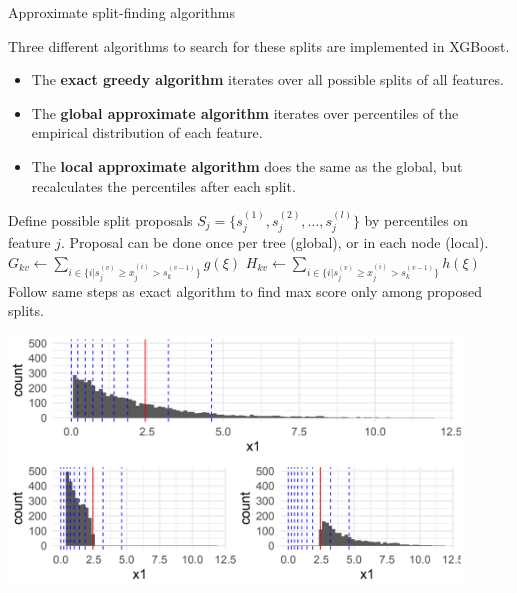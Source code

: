 \begin{vbframe}{Approximate split-finding algorithms}

Three different algorithms to search for these splits are implemented in XGBoost.

\lz

\begin{itemize}
\item[] The \textbf{exact greedy algorithm} iterates over all possible splits of all features.
\lz
\item[] The \textbf{global approximate algorithm} iterates over percentiles of the empirical distribution of each feature.
\lz
\item[] The \textbf{local approximate algorithm} does the same as the global, but recalculates the percentiles after each split.
\end{itemize}

\framebreak

\begin{algorithm}[H]
\begin{footnotesize}
\begin{center}
  \begin{algorithmic}[1]
      \State Define possible split proposals $S_j = \{s_{j}^{(1)}, s_{j}^{(2)}, \hdots, s_{j}^{(l)}\}$ by percentiles on feature $j$.
      \State Proposal can be done once per tree (global), or in each node (local).
    \EndFor
      \State ${G}_{kv} \gets \sum_{i \in \{i|s_j^{(v)} \geq x_j^{(i)} > s_{k}^{(v - 1)}\}} g(\xi)$
      \State ${H}_{kv} \gets \sum_{i \in \{i|s_j^{(v)} \geq x_j^{(i)} > s_{k}^{(v - 1)}\}} h(\xi)$
    \EndFor
    \State Follow same steps as exact algorithm to find max score only among proposed splits.
  \end{algorithmic}
\end{center}
\end{footnotesize}
\caption{Approximate algorithm for split finding}
\end{algorithm}

\framebreak

\vspace{0.2cm}

\begin{center}
\includegraphics[width=0.9\textwidth]{figure_man/split-finding01.png}
\end{center}


\end{vbframe}
